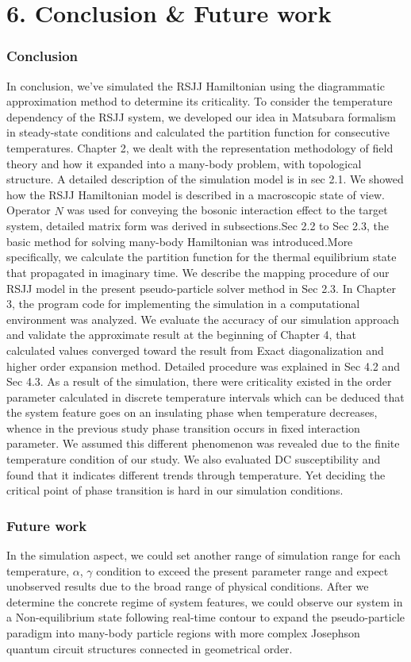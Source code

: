 \documentclass{article}[12pt]
\begin{document}
\section*{6. Conclusion \& Future work}
\begin{spacing}{1.5}
    \subsubsection*{Conclusion}
In conclusion, we’ve simulated the RSJJ Hamiltonian using the diagrammatic approximation method to determine its criticality. 
To consider the temperature dependency of the RSJJ system, we developed our idea in Matsubara formalism in steady-state conditions 
and calculated the partition function for consecutive temperatures. Chapter 2, we dealt with the representation methodology of field theory 
and how it expanded into a many-body problem, with topological structure. A detailed description of the simulation model is in sec 2.1. We showed how the RSJJ Hamiltonian model 
is described in a macroscopic state of view. Operator $\hat{N}$ was used for conveying the bosonic interaction effect to the target system, 
detailed matrix form was derived in subsections.Sec 2.2 to Sec 2.3, 
the basic method for solving many-body Hamiltonian was introduced.More specifically, 
we calculate the partition function for the thermal equilibrium state that propagated in imaginary time. 
We describe the mapping procedure of our RSJJ model in the present pseudo-particle solver method in Sec 2.3.  
 In Chapter 3, the program code for implementing the simulation in a computational environment 
was analyzed. We evaluate the accuracy of our simulation approach and validate the approximate result at the beginning of Chapter 4, 
that calculated values converged toward the result from Exact diagonalization and higher order expansion method. 
Detailed procedure was explained in Sec 4.2 and Sec 4.3. As a result of the simulation, 
there were criticality existed in the order parameter calculated in discrete temperature intervals 
which can be deduced that the system feature goes on an insulating phase when temperature decreases, 
whence in the previous study phase transition occurs in fixed interaction parameter. 
We assumed this different phenomenon was revealed due to the finite temperature condition of our study. 
We also evaluated DC susceptibility and found that it indicates different trends through temperature. 
Yet deciding the critical point of phase transition is hard in our simulation conditions. 
\subsubsection*{Future work}
In the simulation aspect, we could set another range of simulation range for each temperature, 
$\alpha$, $\gamma$ condition to exceed the present parameter range and expect unobserved results 
due to the broad range of physical conditions. After we determine the concrete regime of system features, 
we could observe our system in a Non-equilibrium state following real-time contour to expand the pseudo-particle paradigm 
into many-body particle regions with more complex Josephson quantum circuit structures connected in geometrical order.
\end{spacing}
\pagebreak
\newpage
\end{document}

